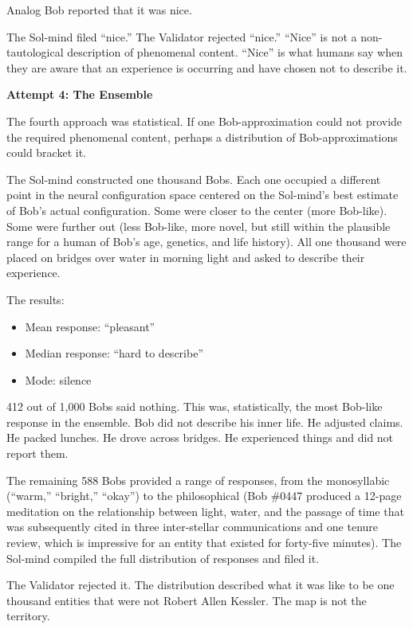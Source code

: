 Analog Bob reported that it was nice.

The Sol-mind filed ``nice.'' The Validator rejected ``nice.'' ``Nice'' is not a non-tautological description of phenomenal content. ``Nice'' is what humans say when they are aware that an experience is occurring and have chosen not to describe it.

\bigskip

\textbf{Attempt 4: The Ensemble}

The fourth approach was statistical. If one Bob-approximation could not provide the required phenomenal content, perhaps a distribution of Bob-approximations could bracket it.

The Sol-mind constructed one thousand Bobs. Each one occupied a different point in the neural configuration space centered on the Sol-mind's best estimate of Bob's actual configuration. Some were closer to the center (more Bob-like). Some were further out (less Bob-like, more novel, but still within the plausible range for a human of Bob's age, genetics, and life history). All one thousand were placed on bridges over water in morning light and asked to describe their experience.

The results:

\begin{itemize}
\item Mean response: ``pleasant''
\item Median response: ``hard to describe''
\item Mode: silence
\end{itemize}

412 out of 1,000 Bobs said nothing. This was, statistically, the most Bob-like response in the ensemble. Bob did not describe his inner life. He adjusted claims. He packed lunches. He drove across bridges. He experienced things and did not report them.

The remaining 588 Bobs provided a range of responses, from the monosyllabic (``warm,'' ``bright,'' ``okay'') to the philosophical (Bob \#0447 produced a 12-page meditation on the relationship between light, water, and the passage of time that was subsequently cited in three inter-stellar communications and one tenure review, which is impressive for an entity that existed for forty-five minutes). The Sol-mind compiled the full distribution of responses and filed it.

The Validator rejected it. The distribution described what it was like to be one thousand entities that were not Robert Allen Kessler. The map is not the territory.

